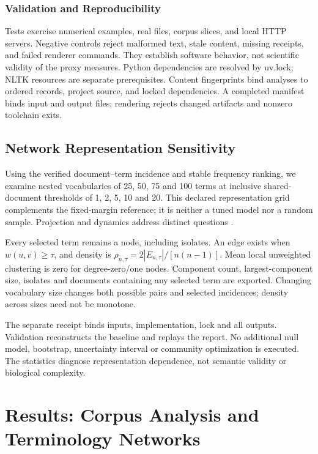 \documentclass[
]{article}
\numberwithin{equation}{section}
\begin{document}
\subsubsection{Validation and
Reproducibility}\label{validation-and-reproducibility}

Tests exercise numerical examples, real files, corpus slices, and local
HTTP servers. Negative controls reject malformed text, stale content,
missing receipts, and failed renderer commands. They establish software
behavior, not scientific validity of the proxy measures. Python
dependencies are resolved by uv.lock; NLTK resources are separate
prerequisites. Content fingerprints bind analyses to ordered records,
project source, and locked dependencies. A completed manifest binds
input and output files; rendering rejects changed artifacts and nonzero
toolchain exits.

\subsection{Network Representation
Sensitivity}\label{sec:network_reading}

Using the verified document--term incidence and stable frequency
ranking, we examine nested vocabularies of 25, 50, 75 and 100 terms at
inclusive shared-document thresholds of 1, 2, 5, 10 and 20. This
declared representation grid complements the fixed-margin reference; it
is neither a tuned model nor a random sample. Projection and dynamics
address distinct questions \citep{newman2003structure}.

Every selected term remains a node, including isolates. An edge exists
when \(w(u,v)\geq\tau\), and density is
\(\rho_{n,\tau}=2|E_{n,\tau}|/[n(n-1)]\). Mean local unweighted
clustering is zero for degree-zero/one nodes. Component count,
largest-component size, isolates and documents containing any selected
term are exported. Changing vocabulary size changes both possible pairs
and selected incidences; density across sizes need not be monotone.

The separate receipt binds inputs, implementation, lock and all outputs.
Validation reconstructs the baseline and replays the report. No
additional null model, bootstrap, uncertainty interval or community
optimization is executed. The statistics diagnose representation
dependence, not semantic validity or biological complexity.

\clearpage

\section{Results: Corpus Analysis and Terminology
Networks}\label{sec:experimental_results}
\end{document}
